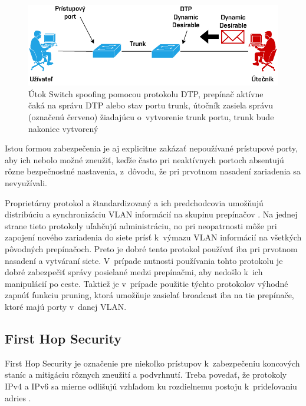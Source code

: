\begin{figure}[H]
	\begin{center}
		\includegraphics[scale=0.75]{obrazky/switch-spoofing.pdf}
	\end{center}
	\caption[Útok Switch spoofing pomocou protokolu DTP]{Útok Switch spoofing pomocou protokolu DTP, prepínač aktívne čaká na správu DTP alebo stav portu trunk, útočník zasiela správu (označenú červeno) žiadajúcu o~vytvorenie trunk portu, trunk bude nakoniec vytvorený}
	\label{fig:switch-spoofing}
\end{figure} 


Istou formou zabezpečenia je aj explicitne zakázať nepoužívané prístupové porty, aby ich nebolo možné zneužiť, keďže často pri neaktívnych portoch absentujú rôzne bezpečnostné nastavenia, z~dôvodu, že pri prvotnom nasadení zariadenia sa nevyužívali.  

Proprietárny protokol  a štandardizovaný  a ich predchodcovia umožňujú distribúciu a synchronizáciu VLAN informácií na skupinu prepínačov \cite{Vyncke2008}. Na jednej strane tieto protokoly uľahčujú administráciu, no pri neopatrnosti môže pri zapojení nového zariadenia do siete prísť k~výmazu VLAN informácií na všetkých pôvodných prepínačoch. Preto je dobré tento protokol používať iba pri prvotnom nasadení a vytváraní siete. V~prípade nutnosti používania tohto protokolu je dobré zabezpečiť správy posielané medzi prepínačmi, aby nedošlo k~ich manipulácií po ceste. Taktiež je v~prípade použitie týchto protokolov výhodné zapnúť funkciu pruning, ktorá umožňuje zasielať broadcast iba na tie prepínače, ktoré majú porty v~danej VLAN. 


\subsection{First Hop Security}
First Hop Security je označenie pre niekoľko prístupov k~zabezpečeniu koncových staníc a mitigáciu rôznych zneužití a podvrhnutí. Treba povedať, že protokoly IPv4 a IPv6 sa mierne odlišujú vzhľadom ku rozdielnemu postoju k~prideľovaniu adries \cite{Satrapa2019}.

